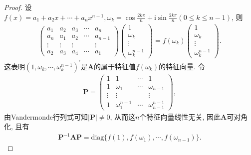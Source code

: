 \documentclass[../../main.tex]{subfiles}%
\begin{document}
\begin{proof}
设\(f(x)=a_{1}+a_{2}x+\cdots+a_{n}x^{n - 1},\omega_{k}=\cos\frac{2k\pi}{n}+\mathrm{i}\sin\frac{2k\pi}{n}(0\leqslant  k\leqslant  n - 1)\), 则
\begin{align*}
\begin{pmatrix}
a_{1}&a_{2}&a_{3}&\cdots&a_{n}\\
a_{n}&a_{1}&a_{2}&\cdots&a_{n - 1}\\
\vdots&\vdots&\vdots&&\vdots\\
a_{2}&a_{3}&a_{4}&\cdots&a_{1}
\end{pmatrix}\begin{pmatrix}
1\\
\omega_{k}\\
\vdots\\
\omega_{k}^{n - 1}
\end{pmatrix}=f(\omega_{k})\begin{pmatrix}
1\\
\omega_{k}\\
\vdots\\
\omega_{k}^{n - 1}
\end{pmatrix}.
\end{align*}
这表明\((1,\omega_{k},\cdots,\omega_{k}^{n - 1})^{\prime}\)是\(\boldsymbol{A}\)的属于特征值\(f(\omega_{k})\)的特征向量. 令
\begin{align*}
\boldsymbol{P}=\begin{pmatrix}
1&1&\cdots&1\\
1&\omega_{1}&\cdots&\omega_{n - 1}\\
\vdots&\vdots&&\vdots\\
1&\omega_{1}^{n - 1}&\cdots&\omega_{n - 1}^{n - 1}
\end{pmatrix},
\end{align*}
由Vandermonde行列式可知\(\vert\boldsymbol{P}\vert\neq 0\), 从而这\(n\)个特征向量线性无关, 因此\(\boldsymbol{A}\)可对角化, 且有
\begin{align*}
\boldsymbol{P}^{-1}\boldsymbol{AP}=\mathrm{diag}\{f(1),f(\omega_{1}),\cdots,f(\omega_{n - 1})\}.
\end{align*} 
\end{proof}
\end{document}
